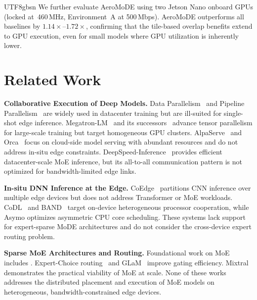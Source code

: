 \documentclass[conference]{IEEEtran}
\begin{document}
\begin{CJK*}{UTF8}{gbsn}
We further evaluate AeroMoDE using two Jetson Nano onboard GPUs
(locked at~460\,MHz, Environment~A at 500\,Mbps).  AeroMoDE
outperforms all baselines by $1.14\times$--$1.72\times$, confirming
that the tile-based overlap benefits extend to GPU execution, even
for small models where GPU utilization is inherently lower.

\section{Related Work}
\label{sec:related}

\textbf{Collaborative Execution of Deep Models.}
Data Parallelism~\cite{li2014parameter,rajbhandari2020zero} and
Pipeline Parallelism~\cite{huang2019gpipe,narayanan2019pipedream}
are widely used in datacenter training but are ill-suited for
single-shot edge inference.  Megatron-LM~\cite{shoeybi2019megatron}
and its successors~\cite{narayanan2021efficient,korthikanti2023reducing}
advance tensor parallelism for large-scale training but target
homogeneous GPU clusters.  AlpaServe~\cite{li2023alpaserve} and
Orca~\cite{yu2022orca} focus on cloud-side model serving with
abundant resources and do not address in-situ edge constraints.
DeepSpeed-Inference~\cite{aminabadi2022deepspeed} provides efficient
datacenter-scale MoE inference, but its all-to-all communication
pattern is not optimized for bandwidth-limited edge links.

\textbf{In-situ DNN Inference at the Edge.}
CoEdge~\cite{zeng2020coedge} partitions CNN inference over multiple
edge devices but does not address Transformer or MoE workloads.
CoDL~\cite{jia2022codl} and BAND~\cite{jeong2022band} target
on-device heterogeneous processor cooperation, while Asymo
\cite{wang2021asymo} optimizes asymmetric CPU core scheduling.
These systems lack support for expert-sparse MoDE architectures and
do not consider the cross-device expert routing problem.

\textbf{Sparse MoE Architectures and Routing.}
Foundational work on MoE includes \cite{shazeer2017moe,
fedus2022switch,lepikhin2021gshard}.  Expert-Choice
routing~\cite{zhou2022mixtureofexperts_routing} and
GLaM~\cite{du2022glam} improve gating efficiency.
Mixtral~\cite{jiang2024mixtral} demonstrates the practical
viability of MoE at scale.  None of these works addresses the
distributed placement and execution of MoE models on
heterogeneous, bandwidth-constrained edge devices.


\end{CJK*}
\end{document}

